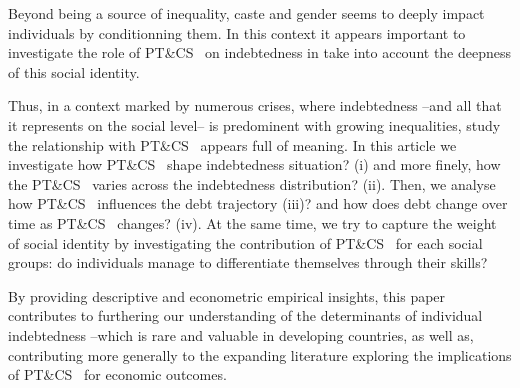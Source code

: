 \documentclass[a4paper, 11pt, onecolumn]{article}
\newcommand{\PTCS}{PT\&CS}
\begin{document}
Beyond being a source of inequality, caste and gender seems to deeply impact individuals by conditionning them.
In this context it appears important to investigate the role of \PTCS~ on indebtedness in take into account the deepness of this social identity.




Thus, in a context marked by numerous crises, where indebtedness --and all that it represents on the social level-- is predominent with growing inequalities, study the relationship with \PTCS~ appears full of meaning.
In this article we investigate how \PTCS~ shape indebtedness situation? (i) and more finely, how the \PTCS~ varies across the indebtedness distribution? (ii).
Then, we analyse how \PTCS~ influences the debt trajectory (iii)? and how does debt change over time as \PTCS~ changes? (iv).
At the same time, we try to capture the weight of social identity by investigating the contribution of \PTCS~ for each social groups: do individuals manage to differentiate themselves through their skills?

By providing descriptive and econometric empirical insights, this paper contributes to furthering our understanding of the determinants of individual indebtedness --which is rare and valuable in developing countries, as well as, contributing more generally to the expanding literature exploring the implications of \PTCS~ for economic outcomes.
\end{document}
